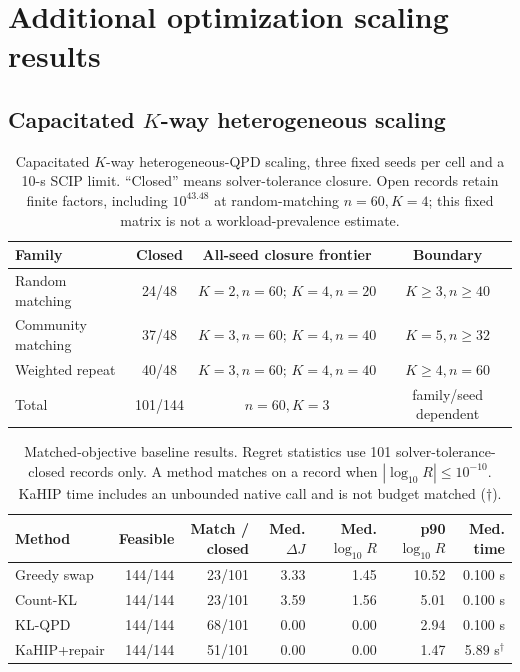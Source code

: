 \documentclass[
  aps,
  pra,
  reprint,
  amsmath,
  amssymb,
  longbibliography,
  nofootinbib,
  floatfix
]{revtex4-2}
\theoremstyle{plain}
\newcommand{\tabfitstar}[1]{{\footnotesize #1}}
\begin{document}
\section{Additional optimization scaling results}
\label{app:scaling}

\subsection{Capacitated \texorpdfstring{$K$}{K}-way heterogeneous scaling}
\label{app:scaling-detail}

\begin{table}[t]
\centering
\caption{Capacitated $K$-way heterogeneous-QPD scaling, three fixed seeds per cell and a 10-s SCIP limit. ``Closed'' means solver-tolerance closure. Open records retain finite factors, including $10^{43.48}$ at random-matching $n=60,K=4$; this fixed matrix is not a workload-prevalence estimate.}
\label{tab:e9-kway}
\tabfitstar{%
\begin{tabular*}{\textwidth}{@{\extracolsep{\fill}}lccc@{}}
\toprule
\textbf{Family} & \textbf{Closed} & \textbf{All-seed closure frontier} & \textbf{Boundary}\\
\midrule
Random matching & 24/48 & $K=2,n=60;\,K=4,n=20$ & $K\geq3,n\geq40$\\
Community matching & 37/48 & $K=3,n=60;\,K=4,n=40$ & $K=5,n\geq32$\\
Weighted repeat & 40/48 & $K=3,n=60;\,K=4,n=40$ & $K\geq4,n=60$\\
\midrule
Total & 101/144 & $n=60,K=3$ & family/seed dependent\\
\bottomrule
\end{tabular*}
}
\end{table}

\begin{table}[t]
\centering
\caption{Matched-objective baseline results. Regret statistics use 101 solver-tolerance-closed records only. A method matches on a record when $|\log_{10}R|\le10^{-10}$. KaHIP time includes an unbounded native call and is not budget matched ($\dagger$).}
\label{tab:e9-heuristic}
\tabfitstar{%
\begin{tabular*}{\textwidth}{@{\extracolsep{\fill}}lrrrrrr@{}}
\toprule
\textbf{Method} & \textbf{Feasible} & \textbf{Match / closed} & \textbf{Med. $\Delta J$} & \textbf{Med. $\log_{10}R$} & \textbf{p90 $\log_{10}R$} & \textbf{Med. time}\\
\midrule
Greedy swap & 144/144 & 23/101 & 3.33 & 1.45 & 10.52 & 0.100 s\\
Count-KL & 144/144 & 23/101 & 3.59 & 1.56 & 5.01 & 0.100 s\\
KL-QPD & 144/144 & 68/101 & 0.00 & 0.00 & 2.94 & 0.100 s\\
KaHIP+repair & 144/144 & 51/101 & 0.00 & 0.00 & 1.47 & 5.89 s$^\dagger$\\
\bottomrule
\end{tabular*}
}
\end{table}
\end{document}
